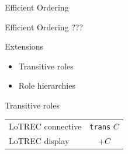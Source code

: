 \documentclass{beamer}
\begin{document}
\begin{frame}{Efficient Ordering}

\begin{block}{Efficient Ordering}
???
\end{block}

\end{frame}


\begin{frame}{Extensions}

\begin{itemize}
\item Transitive roles
\item Role hierarchies
\end{itemize}

\end{frame}

\begin{frame}{Transitive roles}

\begin{table}[h]
\begin{center}
\begin{tabular}{l c}
LoTREC connective & \texttt{trans} $C$ \\
LoTREC display & $+C$ \\
\end{tabular}
\end{center}
\end{table}

\begin{table}[h]
\begin{center}
\end{center}
\end{table}

\end{frame}
\end{document}
